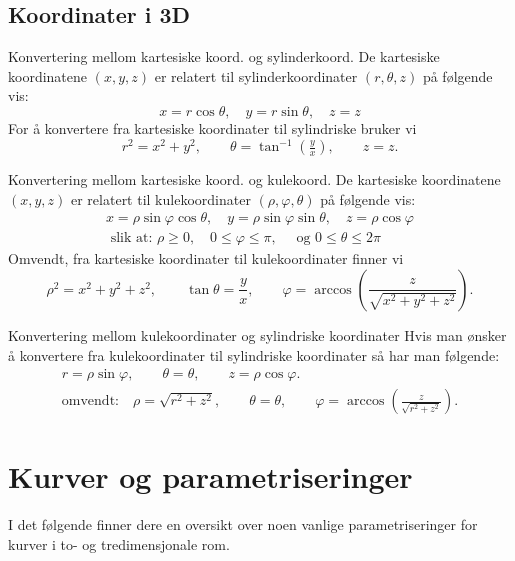 \subsection*{Koordinater i 3D}
\begin{oppsum}{Konvertering mellom kartesiske koord. og sylinderkoord.}
De kartesiske koordinatene $(x,y,z)$ er relatert til sylinderkoordinater $(r,\theta,z)$ på følgende vis:
\[
x = r \cos \theta, \quad y = r \sin \theta, \quad z = z
\]
For å konvertere fra kartesiske koordinater til sylindriske bruker vi
\[
r^{2} = x^{2} + y^{2}, 
\qquad 
\theta = \tan^{-1}\!\left(\tfrac{y}{x}\right), 
\qquad 
z = z.
\]
\end{oppsum}

\begin{oppsum}{Konvertering mellom kartesiske koord. og kulekoord.}
De kartesiske koordinatene $(x,y,z)$ er relatert til kulekoordinater $(\rho, \varphi, \theta)$ på følgende vis:
\begin{align*}
x = \rho \sin \varphi \cos \theta, \quad y = \rho \sin \varphi \sin \theta, \quad z = \rho \cos \varphi \\
\text{ slik at: }
\rho \geq 0, \quad 0 \leq \varphi \leq \pi, \quad \text{ og } 0 \leq  \theta \leq 2\pi
\end{align*}
Omvendt, fra kartesiske koordinater til kulekoordinater finner vi
\[
\rho^{2} = x^{2} + y^{2} + z^{2}, \qquad 
\tan \theta = \frac{y}{x}, \qquad 
\varphi = \arccos\!\left(\frac{z}{\sqrt{x^{2} + y^{2} + z^{2}}}\right).
\]
\end{oppsum}

\begin{oppsum}{Konvertering mellom kulekoordinater og sylindriske koordinater}
Hvis man ønsker å konvertere fra kulekoordinater til sylindriske koordinater så har man følgende:
\begin{align*}
r = \rho \sin \varphi, \qquad 
\theta = \theta, \qquad 
z = \rho \cos \varphi.\\
\text{omvendt:} \quad \rho = \sqrt{r^{2} + z^{2}}, \qquad 
\theta = \theta, \qquad 
\varphi = \arccos\!\left(\frac{z}{\sqrt{r^{2} + z^{2}}}\right).
\end{align*}
\end{oppsum}

\section{Kurver og parametriseringer}
I det følgende finner dere en oversikt over noen vanlige parametriseringer for kurver i to- og tredimensjonale rom. 

